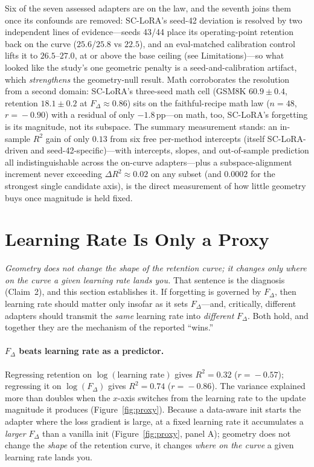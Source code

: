 \documentclass[11pt]{article}
\newcommand{\dw}{F_{\Delta}}
\begin{document}
Six of the seven assessed adapters are on the law, and the seventh joins them
once its confounds are removed: SC-LoRA's seed-42 deviation is resolved by two
independent lines of evidence---seeds 43/44 place its operating-point retention
back on the curve ($25.6$/$25.8$ vs $22.5$), and an eval-matched calibration
control lifts it to $26.5$--$27.0$, at or above the base
ceiling (see Limitations)---so what looked like the study's one
geometric penalty is a seed-and-calibration artifact, which \emph{strengthens}
the geometry-null result. Math corroborates the resolution from a second
domain: SC-LoRA's three-seed math cell (GSM8K $60.9\!\pm\!0.4$, retention
$18.1\!\pm\!0.2$ at $\dw\!\approx\!0.86$) sits on the faithful-recipe math law
($n\!=\!48$, $r\!=\!-0.90$) with a residual of only $-1.8$\,pp---on math, too,
SC-LoRA's forgetting is its magnitude, not its subspace. The summary
measurement stands: an in-sample $R^2$ gain of only $0.13$ from six free
per-method intercepts (itself SC-LoRA-driven and seed-42-specific)---with
intercepts, slopes, and out-of-sample prediction all
indistinguishable across the on-curve adapters---plus a subspace-alignment
increment never exceeding $\Delta R^2\!\approx\!0.02$ on any subset (and
$0.0002$ for the strongest single candidate axis), is the direct measurement of
how little geometry buys once
magnitude is held fixed.

\section{Learning Rate Is Only a Proxy}\label{sec:lr}
\emph{Geometry does not change the shape of the retention curve; it changes only
where on the curve a given learning rate lands you.} That sentence is the
diagnosis (Claim~2), and this section establishes it. If forgetting is governed by
$\dw$, then learning rate should matter only insofar as it sets $\dw$---and,
critically, different adapters should transmit the \emph{same} learning rate into
\emph{different} $\dw$. Both hold, and together they are the mechanism of the
reported ``wins.''

\paragraph{$\dw$ beats learning rate as a predictor.} Regressing retention on
$\log(\text{learning rate})$ gives $R^2\!=\!0.32$ ($r\!=\!-0.57$); regressing it on
$\log(\dw)$ gives $R^2\!=\!0.74$ ($r\!=\!-0.86$). The variance explained more than
doubles when the $x$-axis switches from the learning rate to the update magnitude it
produces (Figure~\ref{fig:proxy}). Because a data-aware init starts the adapter
where the loss gradient is large, at a fixed learning rate it accumulates a
\emph{larger} $\dw$ than a vanilla init (Figure~\ref{fig:proxy}, panel A); geometry
does not change the \emph{shape} of the retention curve, it changes \emph{where on
the curve} a given learning rate lands you.
\end{document}
